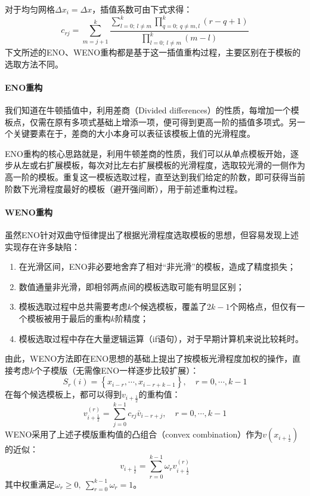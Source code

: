 \documentclass[11pt]{article}
\begin{document}
对于均匀网格$\Delta x_i=\Delta x$，插值系数可由下式求得：
\begin{equation}
	c_{rj}=\sum_{m=j+1}^k\dfrac{\sum_{l=0;\ l\neq m}^k\prod_{q=0;\ q\neq m,l}^k\left(r-q+1\right)}{\prod_{l=0;\ l\neq m}^k\left(m-l\right)}
\end{equation}
下文所述的ENO、WENO重构都是基于这一插值重构过程，主要区别在于模板的选取方法不同。

\paragraph{ENO重构} 我们知道在牛顿插值中，利用差商（Divided differences）的性质，每增加一个模板点，仅需在原有多项式基础上增添一项，便可得到更高一阶的插值多项式\citep{sauer_numerical_2018}。另一个关键要素在于，差商的大小本身可以表征该模板上值的光滑程度\citep{cockburn_advanced_1998}。

ENO重构的核心思路就是，利用牛顿差商的性质，我们可以从单点模板开始，逐步从左或右扩展模板，每次对比左右扩展模板的光滑程度，选取较光滑的一侧作为高一阶的模板。重复这一模板选取过程，直至达到我们给定的阶数，即可获得当前阶数下光滑程度最好的模板（避开强间断），用于前述重构过程。

\paragraph{WENO重构} 虽然ENO针对双曲守恒律提出了根据光滑程度选取模板的思想，但容易发现上述实现存在许多缺陷：
\begin{enumerate}
	\item 在光滑区间，ENO非必要地舍弃了相对“非光滑”的模板，造成了精度损失；
	\item 数值通量非光滑，即相邻两点间的模板选取可能有明显区别；
	\item 模板选取过程中总共需要考虑$k$个候选模板，覆盖了$2k-1$个网格点，但仅有一个模板被用于最后的重构$k$阶精度；
	\item 模板选取过程中存在大量逻辑运算（if语句），对于早期计算机来说比较耗时。
\end{enumerate}
由此，WENO方法即在ENO思想的基础上提出了按模板光滑程度加权的操作，直接考虑$k$个子模版（无需像ENO一样逐步比较扩展）：
\begin{equation}
	S_r(i)=\left\{x_{i-r},\cdots,x_{i-r+k-1}\right\},\quad r=0,\cdots,k-1
\end{equation}
在每个候选模板上，都可以得到$v_{i+\frac{1}{2}}$的重构值：
\begin{equation}
	v_{i+\frac{1}{2}}^{(r)}=\sum_{j=0}^{k-1}c_{rj}\bar{v}_{i-r+j},\quad r=0,\cdots,k-1
\end{equation}
WENO采用了上述子模版重构值的凸组合（convex combination）作为$v(x_{i+\frac{1}{2}})$的近似：
\begin{equation}
	v_{i+\frac{1}{2}}=\sum_{r=0}^{k-1}\omega_rv_{i+\frac{1}{2}}^{(r)}
\end{equation}
其中权重满足$\omega_r\geq0,\ \sum_{r=0}^{k-1}\omega_r=1$。
\end{document}
